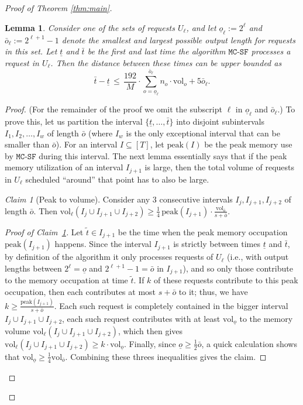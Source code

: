 \documentclass[11pt, a4paper]{article}
\theoremstyle{plain}
\newtheorem{lemma}[theorem]{Lemma}
\theoremstyle{definition}
\theoremstyle{remark}
\newtheorem{claim}[theorem]{Claim}
\newcommand{\mcsdf}{\texttt{MC-SF}}
\newcommand{\vol}{\textrm{vol}}
\newcommand{\alg}{\mcsdf}
\newcommand{\peak}{\mathrm{peak}}
\begin{document}
\begin{proof}[Proof of Theorem \ref{thm:main}]
\begin{lemma} \label{lemma:UBo}
	Consider one of the sets of requests $U_\ell$, and let $\underline{o}_\ell := 2^{\ell}$ and $\bar{o}_\ell := 2^{\ell + 1} - 1$ denote the smallest and largest possible output length for requests in this set. Let $\underline{t}$ and $\bar{t}$ be the first and last time the algorithm $\alg$ processes a request in $U_{\ell}$. Then the distance between these times can be upper bounded as 
	$$\bar{t} - \underline{t} \,\le\, \frac{192}{M} \cdot \sum_{o = \underline{o}_\ell}^{\bar{o}_\ell} n_o \cdot \vol_o + 5 \bar{o}_\ell.$$
\end{lemma}

\begin{proof}
(For the remainder of the proof we omit the subscript $\ell$ in $\underline{o}_\ell$ and $\bar{o}_\ell$.) To prove this, let us partition the interval $\{\underline{t},\ldots,\bar{t}\}$ into disjoint subintervals $I_1,I_2,\ldots,I_w$ of length $\bar{o}$ (where $I_w$ is the only exceptional interval that can be smaller than $\bar{o}$). For an interval $I \subseteq [T]$, let $\peak(I)$ be the peak memory use by $\alg$ during this interval. The next lemma essentially says that if the peak memory utilization of an interval $I_{j+1}$ is large, then the total volume of requests in $U_\ell$ scheduled ``around'' that point has to also be large.

\begin{claim}[Peak to volume] \label{claim:vol-around}
	Consider any 3 consecutive intervals $I_j, I_{j+1}, I_{j+2}$ of length $\bar{o}$. Then $\vol_\ell(I_j \cup I_{j+1} \cup I_{j+2})\ge \frac{1}{4}\, \peak(I_{j+1}) \cdot \frac{\vol_{\bar{o}}}{s + \bar{o}}$.
\end{claim}

\begin{proof}[Proof of Claim~\ref{claim:vol-around}]
	Let $\tilde{t} \in I_{j+1}$ be the time when the peak memory occupation $\peak(I_{j+1})$ happens. Since the interval $I_{j+1}$ is strictly between times $\underline{t}$ and $\bar{t}$, by definition of the algorithm it only processes requests of $U_\ell$ (i.e., with output lengths between $2^\ell = \underline{o}$ and $2^{\ell + 1} - 1 = \bar{o}$ in $I_{j+1}$), and so only those contribute to the memory occupation at time $\tilde{t}$. If $k$ of these requests contribute to this peak occupation, then each contributes at most $s + \bar{o}$ to it; thus, we have $k \ge \frac{\peak(I_{j+1})}{s+\bar{o}}$. Each such request is completely contained in the bigger interval $I_j \cup I_{j+1}\cup I_{j+2}$, each such request contributes with at least $\vol_{\underline{o}}$ to the memory volume $\vol_\ell(I_j \cup I_{j+1}\cup I_{j+2})$, which then gives $\vol_\ell(I_j \cup I_{j+1}\cup I_{j+2}) \ge k \cdot \vol_{\underline{o}}$. Finally, since $\underline{o} \ge \frac{1}{2} \bar{o}$, a quick calculation shows that $\vol_{\underline{o}} \ge \frac{1}{4} \vol_{\bar{o}}$. Combining these threes inequalities gives the claim. 
\end{proof}


\end{proof}
\end{proof}
\end{document}
